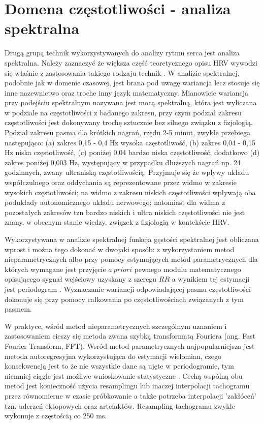 \section{Domena częstotliwości - analiza spektralna}

Drugą grupą technik wykorzystywanych do analizy rytmu serca jest analiza
spektralna. Należy zaznaczyć że większa część teoretycznego opisu HRV wywodzi
się właśnie z zastosowania takiego rodzaju technik \cite{task2, hrv_origins, dynamicMalik}. 
W analizie spektralnej, podobnie jak w domenie czasowej, jest brana pod uwagę wariancja
lecz stosuje się inne nazewnictwo oraz troche inny język matematyczny.
Mianowicie wariancja przy podejściu spektralnym nazywana jest mocą spektralną, która jest 
wyliczana w podziale na częstotliwości z badanego zakresu, przy czym podział zakresu
częstotliwości jest dokonywany trochę sztucznie bez silnego związku z fizjologią. Podział
zakresu pasma dla krótkich nagrań, rzędu 2-5 minut, zwykłe przebiega następująco: (a) 
zakres 0,15 - 0,4 Hz wysoka częstotliwość, (b) zakres 0,04 - 0,15 Hz niska częstotliwość, (c)
poniżej 0,04 bardzo niska częstotliwość, dodatkowo (d) zakres poniżej 0,003 Hz,
występujący w przypadku dłuższych nagrań np. 24 godzinnych, zwany ultraniską częstotliwością.
Przyjmuje się że wplywy układu współczulnego oraz oddychania \cite{task2, hrv_origins, dynamicMalik, Hainsworth} są reprezentowane przez widmo w zakresie wysokich częstotliwości; na widmo z
zakresu niskich częstotliwości wpływają oba podukłady autonomicznego układu nerwowego; 
natomiast dla widma z pozostałych zakresów tzn bardzo niskich i ultra niskich częstotliwości
nie jest znany, w obecnym stanie wiedzy, związek z fizjologią w kontekście HRV. 

Wykorzystywana w analizie spektralnej funkcja gęstości spektralnej jest obliczana wprost i
można tego dokonać w dwojaki sposób: z wykorzystaniem metod nieparametrycznych albo przy
pomocy estymujących metod parametrycznych dla których wymagane jest przyjęcie $a\:priori$
pewnego modulu matematycznego opisującego sygnał wejściowy uzyskany z szeregu $RR$ a
wynikiem tej estymacji jest periodogram \cite{task2, hrv_origins, shumway, lomb_o, scargle, lombCasti, dsp_engel}. Wyznaczanie wariancji odpowiadającej pasmu
częstotliwości dokonuje się przy pomocy całkowania po częstotliwościach związanych z tym
pasmem. 

W praktyce, wśród metod nieparametrycznych szczególnym uznaniem i zastosowaniem cieszy się
metoda zwana szybką transformatą Fouriera (ang. Fast Fourier Transform, FFT). Wsród metod
parametrycznych najpopularniejsza jest metoda autoregresyjna wykorzystująca do estymacji
wielomian, czego konsekwencją jest to że nie wszystkie dane są ujęte w periodogramie, tym
niemniej ciągle jest możliwe wnioskowanie statystyczne \cite{task, hrv_origins, dsp_engel, lomb,scargle,lombCasti,shumway}. Cechą wspólną obu metod jest
konieczność użycia resamplingu lub inaczej interpolacji tachogramu przez równomierne w
czasie próbkowanie a także potrzeba interpolacji 'zakłóceń' tzn. uderzeń ektopowych oraz
artefaktów. Resampling tachogramu zwykle wykonuje z częstością co 250 ms.


